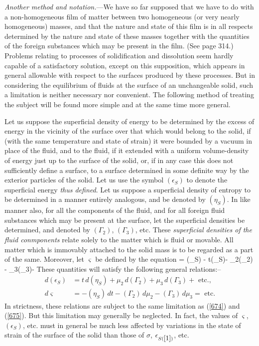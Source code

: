 \documentclass[12pt]{article}
\begin{document}
\textit{Another method and notation.}---We have so far supposed that we have to do with a non-homogeneous film of matter between two homogeneous (or very nearly homogeneous) masses, and that the nature and state of this film is in all respects determined by the nature and state of these masses together with the quantities of the foreign substances which may be present in the film. (See page 314.) Problems relating to processes of solidification and dissolution seem hardly capable of a satisfactory solution, except on this supposition, which appears in general allowable with respect to the surfaces produced by these processes. But in considering the equilibrium of fluids at the surface of an unchangeable solid, such a limitation is neither necessary nor convenient. The following method of treating the subject will be found more simple and at the same time more general.

Let us suppose the superficial density of energy to be determined by the excess of energy in the vicinity of the surface over that which would belong to the solid, if (with the same temperature and state of strain) it were bounded by a vacuum in place of the fluid, and to the fluid, if it extended with a uniform volume-density of energy just up to the surface of the solid, or, if in any case this does not sufficiently define a surface, to a surface determined in some definite way by the exterior particles of the solid. Let us use the symbol $(\epsilon_S)$ to denote the superficial energy \textit{thus defined}. Let us suppose a superficial density of entropy to be determined in a manner entirely analogous, and be denoted by $(\eta_S)$. In like manner also, for all the components of the fluid, and for all foreign fluid substances which may be present at the surface, let the superficial densities be determined, and denoted by $(\Gamma_2)$, $(\Gamma_3)$, etc. These \textit{superficial densities of the fluid conmponents} relate solely to the matter which is fluid or movable. All matter which is immovably attached to the solid mass is to be regarded as a part of the same. Moreover, let $\varsigma$ be defined by the equation
\eqs \varsigma = (\epsilon_S) - t(\eta_S)- \mu_2(\Gamma_2) - \mu_3(\Gamma_3)-     \label{676} \eqe
These quantities will satisfy the following general relations:--
\begin{align}
d(\epsilon_S) &= t\, d(\eta_S)+ \mu_2\, d (\Gamma_2) + \mu_3\, d (\Gamma_3) + \text{ etc.}, \label{677} \\
d \varsigma &= - (\eta_S)\, dt -(\Gamma_2)\, d \mu_2 -  (\Gamma_3)\, d \mu_3 = \text{ etc.}  \label{677} \end{align}
In strictness, these relations are subject to the same limitation as (\ref{674}) and (\ref{675}). But this limitation may generally be neglected. In fact, the values of $\varsigma$, $(\epsilon_S)$, etc. must in general be much less affected by variations in the state of strain of the surface of the solid than those of $\sigma$, $\epsilon_{S(\ref{1})}$, etc.
\end{document}
